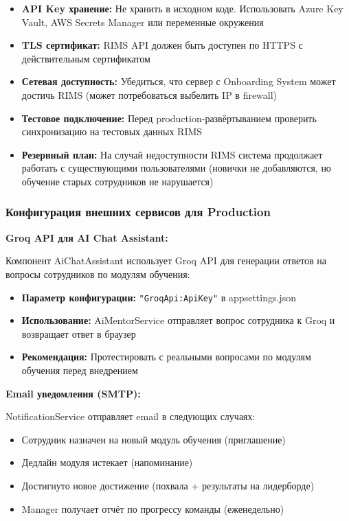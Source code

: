 \begin{itemize}
	\item \textbf{API Key хранение:} Не хранить в исходном коде. Использовать Azure Key Vault, AWS Secrets Manager или переменные окружения
	\item \textbf{TLS сертификат:} RIMS API должен быть доступен по HTTPS с действительным сертификатом
	\item \textbf{Сетевая доступность:} Убедиться, что сервер с Onboarding System может достичь RIMS (может потребоваться выбелить IP в firewall)
	\item \textbf{Тестовое подключение:} Перед production-развёртыванием проверить синхронизацию на тестовых данных RIMS
	\item \textbf{Резервный план:} На случай недоступности RIMS система продолжает работать с существующими пользователями (новички не добавляются, но обучение старых сотрудников не нарушается)
\end{itemize}

\subsubsection*{Конфигурация внешних сервисов для Production}

\textbf{Groq API для AI Chat Assistant:}

Компонент AiChatAssistant использует Groq API для генерации ответов на вопросы сотрудников по модулям обучения:

\begin{itemize}
	\item \textbf{Параметр конфигурации:} \texttt{"GroqApi:ApiKey"} в appsettings.json
	\item \textbf{Использование:} AiMentorService отправляет вопрос сотрудника к Groq и возвращает ответ в браузер
	\item \textbf{Рекомендация:} Протестировать с реальными вопросами по модулям обучения перед внедрением
\end{itemize}

\textbf{Email уведомления (SMTP):}

NotificationService отправляет email в следующих случаях:
\begin{itemize}
	\item Сотрудник назначен на новый модуль обучения (приглашение)
	\item Дедлайн модуля истекает (напоминание)
	\item Достигнуто новое достижение (похвала + результаты на лидерборде)
	\item Manager получает отчёт по прогрессу команды (еженедельно)
\end{itemize}


